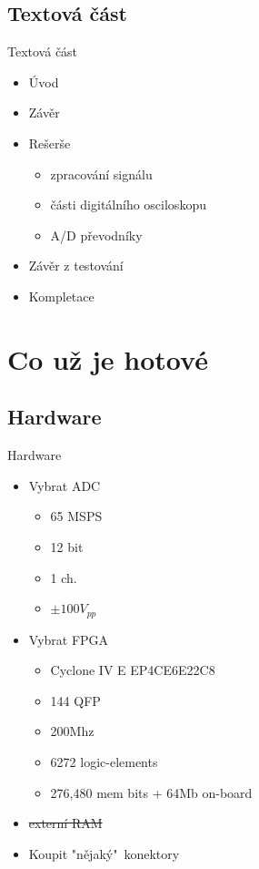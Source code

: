 \documentclass{beamer}
\begin{document}
	\subsection{Textová část}
	\begin{frame}{Textová část}
		\begin{itemize}
			\item Úvod
			\item Závěr
			\item Rešerše
			\begin{itemize}  %
				\item zpracování signálu
				\item části digitálního osciloskopu
				\item A/D převodníky
			\end{itemize}
			\item Závěr z testování
			\item Kompletace
		\end{itemize}
	\end{frame}
		
	
\section{Co už je hotové}

	\subsection{Hardware}
	\begin{frame}{Hardware}
		\begin{itemize}
			\item Vybrat ADC
				\begin{itemize}
					\item 65 MSPS
					\item 12 bit
					\item 1 ch.
					\item $ \pm 100V_{pp} $
				\end{itemize}
			\item Vybrat FPGA
				\begin{itemize}
					\item Cyclone IV E EP4CE6E22C8
					\item 144 QFP
					\item 200Mhz
					\item 6272 logic-elements
					\item 276,480 mem bits + 64Mb on-board
				\end{itemize}			
			\item \sout{externí RAM}
			\item Koupit "nějaký"\ konektory
		\end{itemize}
	\end{frame}
	
\end{document}

